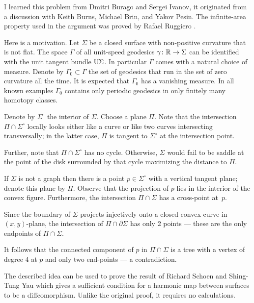 I learned this problem from
Dmitri Burago 
and Sergei Ivanov, 
it originated from a discussion with
Keith Burns, 
Michael Brin, 
and Yakov Pesin.
The infinite-area property used in the argument was proved by Rafael Ruggiero \cite[Lemma 4.1]{ruggiero}.

Here is a motivation.
Let $\Sigma$ be a closed surface with non-positive curvature that is not flat.
The space $\Gamma$ of all unit-speed geodesics $\gamma\:\RR\z\to\Sigma$ can be identified with the unit tangent bundle $\mathrm{U}\Sigma$.
In particular $\Gamma$ comes with a natural choice of measure.
Denote by $\Gamma_0\subset \Gamma$ the set of geodesics that run in the set of zero curvature all the time.
It is expected that $\Gamma_0$ has a vanishing measure.
In all known examples $\Gamma_0$ contains only periodic geodesics in only finitely many homotopy classes.

Denote by $\Sigma^\circ$ the interior of $\Sigma$.
Choose a plane $\Pi$.
Note that the intersection $\Pi\cap \Sigma^\circ$ 
locally looks either like a curve or like two curves intersecting transversally;
in the latter case, $\Pi$ is tangent to $\Sigma^\circ$ at the intersection point.

Further, note that $\Pi\cap \Sigma^\circ$ has no cycle.
Otherwise, $\Sigma$ would fail to be saddle at the point of the disk surrounded by that cycle maximizing the distance to $\Pi$.

If $\Sigma$ is not a graph then there is a point $p\in\Sigma^\circ$ with a vertical tangent plane; denote this plane by $\Pi$.
Observe that the projection of $p$ lies in the interior of the convex figure.
Furthermore, the intersection $\Pi\cap\Sigma$ has a cross-point at~$p$.

Since the boundary of $\Sigma$ projects injectively onto a closed convex curve in $(x,y)$-plane,
the intersection of $\Pi\cap\partial \Sigma$ has only 2 points --- these are the only endpoints of $\Pi\cap\Sigma$.

It follows that the connected component of $p$ in $\Pi\cap\Sigma$ is a tree 
with a vertex of degree 4 at $p$ and only two end-points --- a contradiction.\qeds

The described idea can be used to prove the result of Richard Schoen and Shing-Tung  Yau \cite{schoen-yau-2D} which gives a sufficient condition for a harmonic map between surfaces to be a diffeomorphism.
Unlike the original proof, it requires no calculations.

